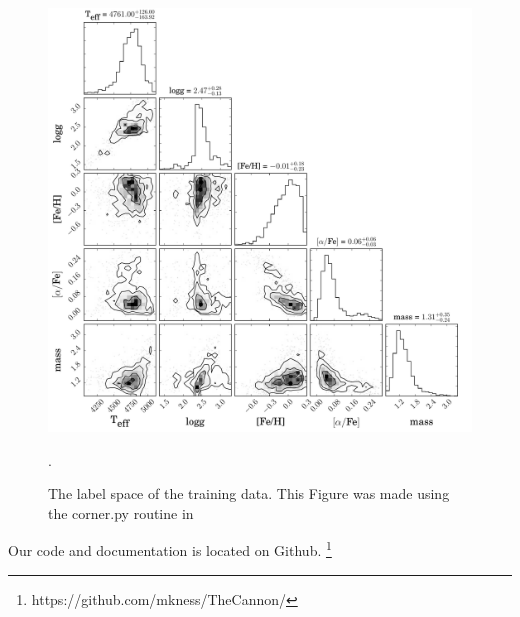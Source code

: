 \documentclass[12pt, preprint]{aastex}
\begin{document}
\begin{figure}[h!]
\centering
        \includegraphics[scale=0.45]{./plots/training.pdf}
  \caption{The label space of the training data. This Figure was made using the corner.py routine in \citet{dfm}}.
\label{fig:triangle}
\end{figure}

Our code and documentation is located on Github. \footnote{https://github.com/mkness/TheCannon/}
\end{document}
